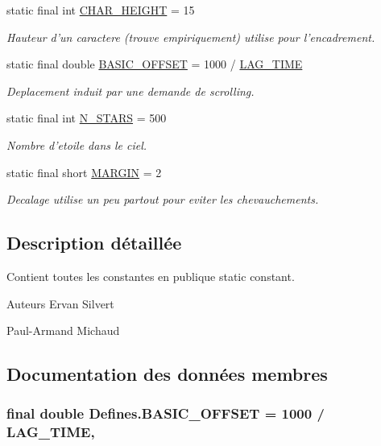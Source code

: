 \begin{DoxyCompactItemize}
static final int \hyperlink{classDefines_aefdb64aa2941d347830f576d61bd941f}{C\-H\-A\-R\-\_\-\-H\-E\-I\-G\-H\-T} = 15
\begin{DoxyCompactList}\small\item\em Hauteur d'un caractere (trouve empiriquement) utilise pour l'encadrement. \end{DoxyCompactList}\item 
static final double \hyperlink{classDefines_ab31317d73c21ddc857f1d9cac254cd51}{B\-A\-S\-I\-C\-\_\-\-O\-F\-F\-S\-E\-T} = 1000 / \hyperlink{classDefines_a496860d61bb30a925275bfde3ddc3b20}{L\-A\-G\-\_\-\-T\-I\-M\-E}
\begin{DoxyCompactList}\small\item\em Deplacement induit par une demande de scrolling. \end{DoxyCompactList}\item 
static final int \hyperlink{classDefines_a9b91f7213bd4f6c0b70df0e9903c7691}{N\-\_\-\-S\-T\-A\-R\-S} = 500
\begin{DoxyCompactList}\small\item\em Nombre d'etoile dans le ciel. \end{DoxyCompactList}\item 
static final short \hyperlink{classDefines_a9fd7f260f375ce1a158c1b5d7f7b5723}{M\-A\-R\-G\-I\-N} = 2
\begin{DoxyCompactList}\small\item\em Decalage utilise un peu partout pour eviter les chevauchements. \end{DoxyCompactList}\end{DoxyCompactItemize}


\subsection{Description détaillée}
Contient toutes les constantes en publique static constant. 

\begin{DoxyAuthor}{Auteurs}
Ervan Silvert 

Paul-\/\-Armand Michaud 
\end{DoxyAuthor}


\subsection{Documentation des données membres}
\hypertarget{classDefines_ab31317d73c21ddc857f1d9cac254cd51}{
\subsubsection[{B\-A\-S\-I\-C\-\_\-\-O\-F\-F\-S\-E\-T}]{\setlength{\rightskip}{0pt plus 5cm}final double Defines.\-B\-A\-S\-I\-C\-\_\-\-O\-F\-F\-S\-E\-T = 1000 / {\bf L\-A\-G\-\_\-\-T\-I\-M\-E}\hspace{0.3cm}{\ttfamily [static]}, {\ttfamily [package]}}}\label{classDefines_ab31317d73c21ddc857f1d9cac254cd51}


